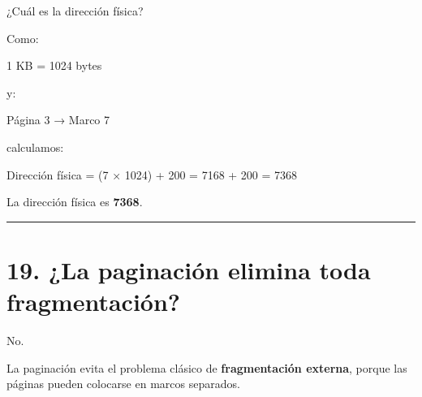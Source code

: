 \documentclass[
  spanish,
  letterpaper,
]{scrbook}
\newenvironment{Shaded}{\begin{snugshade}}{\end{snugshade}}
\newcommand{\NormalTok}[1]{\textcolor[rgb]{0.00,0.23,0.31}{#1}}
\begin{document}
¿Cuál es la dirección física?

\begin{tcolorbox}[enhanced jigsaw, arc=.35mm, bottomrule=.15mm, bottomtitle=1mm, breakable, colback=white, colbacktitle=quarto-callout-tip-color!10!white, colframe=quarto-callout-tip-color-frame, coltitle=black, left=2mm, leftrule=.75mm, opacityback=0, opacitybacktitle=0.6, rightrule=.15mm, title=\textcolor{quarto-callout-tip-color}{\faLightbulb}\hspace{0.5em}{✅ Solución propuesta}, titlerule=0mm, toprule=.15mm, toptitle=1mm]

Como:

\begin{Shaded}
\begin{Highlighting}[]
\NormalTok{1 KB = 1024 bytes}
\end{Highlighting}
\end{Shaded}

y:

\begin{Shaded}
\begin{Highlighting}[]
\NormalTok{Página 3 → Marco 7}
\end{Highlighting}
\end{Shaded}

calculamos:

\begin{Shaded}
\begin{Highlighting}[]
\NormalTok{Dirección física = (7 × 1024) + 200}
\NormalTok{                  = 7168 + 200}
\NormalTok{                  = 7368}
\end{Highlighting}
\end{Shaded}

La dirección física es \textbf{7368}.

\end{tcolorbox}

\begin{center}\rule{0.5\linewidth}{0.5pt}\end{center}


\chapter{19. ¿La paginación elimina toda
fragmentación?}\label{la-paginaciuxf3n-elimina-toda-fragmentaciuxf3n}

No.

La paginación evita el problema clásico de \textbf{fragmentación
externa}, porque las páginas pueden colocarse en marcos separados.
\end{document}
